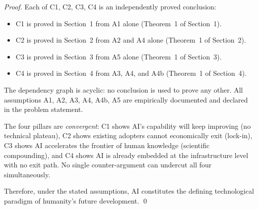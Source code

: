 \documentclass[12pt]{article}
\begin{document}
\begin{proof}
  Each of C1, C2, C3, C4 is an independently proved conclusion:
  \begin{itemize}
    \item C1 is proved in Section~1 from A1 alone (Theorem~1 of Section~1).
    \item C2 is proved in Section~2 from A2 and A4 alone (Theorem~1 of Section~2).
    \item C3 is proved in Section~3 from A5 alone (Theorem~1 of Section~3).
    \item C4 is proved in Section~4 from A3, A4, and A4b (Theorem~1 of Section~4).
  \end{itemize}
  The dependency graph is acyclic: no conclusion is used to prove any
  other.  All assumptions A1, A2, A3, A4, A4b, A5 are empirically
  documented and declared in the problem statement.

  The four pillars are \emph{convergent}: C1 shows AI's capability will
  keep improving (no technical plateau), C2 shows existing adopters
  cannot economically exit (lock-in), C3 shows AI accelerates the
  frontier of human knowledge (scientific compounding), and C4 shows
  AI is already embedded at the infrastructure level with no exit path.
  No single counter-argument can undercut all four simultaneously.

  Therefore, under the stated assumptions, AI constitutes the defining
  technological paradigm of humanity's future development.  \qed
\end{proof}
\end{document}
